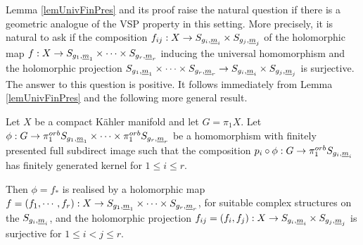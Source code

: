 Lemma \ref{lemUnivFinPres} and its proof raise the natural question if there is a geometric analogue of the VSP property in this setting. More precisely, it is natural to ask if the composition $f_{ij}:X\rightarrow S_{g_i,{\underline{m}}_i} \times S_{g_j,{\underline{m}}_j}$ of the holomorphic map $f: X\rightarrow S_{g_1,{\underline{m}}_1} \times \cdots \times S_{g_r,{\underline{m}}_r}$ inducing the universal homomorphism and the holomorphic projection $S_{g_1,{\underline{m}}_1} \times \cdots \times S_{g_r,{\underline{m}}_r} \rightarrow S_{g_i,{\underline{m}}_i} \times S_{g_j,{\underline{m}}_j}$ is surjective. The answer to this question is positive. It follows immediately from Lemma \ref{lemUnivFinPres} and the following more general result.

\begin{proposition}
 Let $X$ be a compact K\"ahler manifold and let $G=\pi_1 X$. Let $\phi: G \to  \pi_1^{orb} S_{g_1,{\underline{m}}_1} \times \cdots \times \pi_1^{orb} S_{g_r,{\underline{m}}_r}$ be a homomorphism with finitely presented full subdirect image such that the composition $p_i\circ \phi : G \to \pi_1^{orb} S_{g_i,{\underline{m}}_i}$ has finitely generated kernel for $1\leq i \leq r$.
 
 Then $\phi=f_{\ast}$ is realised by a holomorphic map $f=(f_1,\cdots,f_r): X \rightarrow S_{g_1,{\underline{m}}_1} \times \cdots \times S_{g_r,{\underline{m}}_r}$, for suitable complex structures on the $S_{g_i,{\underline{m}}_i}$, and the holomorphic projection $f_{ij}=(f_i,f_j): X \rightarrow S_{g_i,{\underline{m}}_i} \times S_{g_j,{\underline{m}}_j}$ is surjective for $1\leq i < j \leq r$.
\label{propUnivFinPresHol}
\end{proposition}
